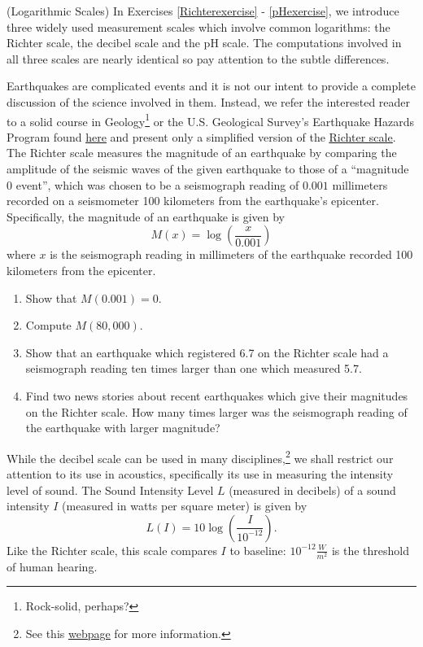 \documentclass{ximera}
\begin{document}
\begin{problem}\label{logarithmicscales}
(Logarithmic Scales) In Exercises \ref{Richterexercise} - \ref{pHexercise}, we introduce three widely used measurement scales which involve common logarithms: the Richter scale, the decibel scale and the pH scale.  The computations involved in all three scales are nearly identical so pay attention to the subtle differences.

\begin{question}\label{Richterexercise} 
Earthquakes are complicated events and it is not our intent to provide a complete discussion of the science involved in them.  Instead, we refer the interested reader to a solid course in Geology\footnote{Rock-solid, perhaps?} or the U.S. Geological Survey's Earthquake Hazards Program found \href{http://earthquake.usgs.gov/}{\underline{here}} and present only a simplified version of the \href{http://en.wikipedia.org/wiki/Richter_scale}{\underline{Richter scale}}.  The Richter scale measures the magnitude of an earthquake by comparing the amplitude of the seismic waves of the given earthquake to those of a ``magnitude 0 event'', which was chosen to be a seismograph reading of $0.001$ millimeters recorded on a seismometer 100 kilometers from the earthquake's epicenter.  Specifically, the magnitude of an earthquake is given by \[M(x) = \log \left(\dfrac{x}{0.001}\right)\] where $x$ is the seismograph reading in millimeters of the earthquake recorded 100 kilometers from the epicenter.  

\begin{enumerate}

\item Show that $M(0.001) = 0$.
\item Compute $M(80,000)$.
\item Show that an earthquake which registered 6.7 on the Richter scale had a seismograph reading ten times larger than one which measured 5.7.
\item Find two news stories about recent earthquakes which give their magnitudes on the Richter scale.  How many times larger was the seismograph reading of the earthquake with larger magnitude?

\end{enumerate}

\end{question}

\begin{question}\label{decibelexercise}
While the decibel scale can be used in many disciplines,\footnote{See this  \href{http://en.wikipedia.org/wiki/Decibel}{\underline{webpage}} for more information.} we shall restrict our attention to its use in acoustics, specifically its use in measuring the intensity level of sound. The Sound Intensity Level $L$ (measured in decibels) of a sound intensity $I$ (measured in watts per square meter) is given by \[L(I) = 10\log\left( \dfrac{I}{10^{-12}} \right).\] Like the Richter scale, this scale compares $I$ to baseline: $10^{-12} \frac{W}{m^{2}}$ is the threshold of human hearing. 


\end{question}
\end{problem}
\end{document}
